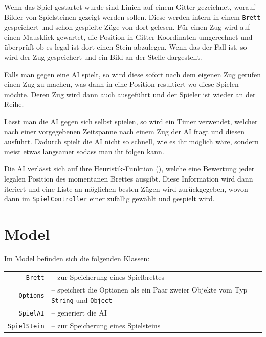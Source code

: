 \documentclass[11pt]{article}
\newcommand{\1}{{\mathds{1}}}
\begin{document}
	Wenn das Spiel gestartet wurde sind Linien auf einem Gitter gezeichnet, worauf Bilder von Spielsteinen gezeigt werden sollen.
	Diese werden intern in einem \lstinline|Brett| gespeichert und schon gespielte Züge von dort gelesen.
	Für einen Zug wird auf einen Mausklick gewartet, die Position in Gitter-Koordinaten umgerechnet und überprüft ob es legal ist dort einen Stein abzulegen.
	Wenn das der Fall ist, so wird der Zug gespeichert und ein Bild an der Stelle dargestellt.

	Falls man gegen eine AI spielt, so wird diese sofort nach dem eigenen Zug gerufen einen Zug zu machen, was dann in eine Position resultiert wo diese Spielen möchte.
	Deren Zug wird dann auch ausgeführt und der Spieler ist wieder an der Reihe.
	
	Lässt man die AI gegen sich selbst spielen, so wird ein Timer verwendet, welcher nach einer vorgegebenen Zeitspanne nach einem Zug der AI fragt und diesen ausführt.
	Dadurch spielt die AI nicht so schnell, wie es ihr möglich wäre, sondern meist etwas langsamer sodass man ihr folgen kann.
	
	Die AI verlässt sich auf ihre Heuristik-Funktion (), welche eine Bewertung jeder legalen Position des momentanen Brettes ausgibt.
	Diese Information wird dann iteriert und eine Liste an möglichen besten Zügen wird zurückgegeben, wovon dann im \lstinline|SpielController| einer zufällig gewählt und gespielt wird.
	
	\section{Model}
	
	Im Model befinden sich die folgenden Klassen:
	
	\begin{center}
		\begin{tabular}{r l}
			\lstinline|Brett| &-- zur Speicherung eines Spielbrettes \\
			\lstinline|Options| &-- speichert die Optionen als ein Paar zweier Objekte vom Typ \lstinline|String| und \lstinline|Object| \\
			\lstinline|SpielAI| &-- generiert die AI \\
			\lstinline|SpielStein| &-- zur Speicherung eines Spielsteins
		\end{tabular}
	\end{center}
	
\end{document}
